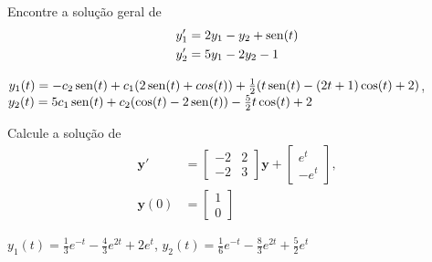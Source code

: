 \begin{exer}
  Encontre a solução geral de
  \begin{align}
    y_1' &= 2y_1 - y_2 + \operatorname{sen}(t)\\
    y_2' &= 5y_1 - 2y_2 - 1
  \end{align}
\end{exer}
\begin{resp}
  $y_{1}(t) = -c_2 \operatorname{sen}(t) + c_1 (2 \operatorname{sen}(t) + cos(t)) + \frac{1}{2}(t \operatorname{sen}(t) - (2 t + 1) \cos(t) + 2)$, $y_2(t) = 5 c_1 \operatorname{sen}(t) + c_2 (\cos(t) - 2 \operatorname{sen}(t)) - \frac{5}{2} t \cos(t) + 2$
\end{resp}

\begin{exer}
  Calcule a solução de
  \begin{align}
    \pmb{y}' &=
    \begin{bmatrix}
      -2 & 2 \\
      -2 & 3
    \end{bmatrix}\pmb{y} +
    \begin{bmatrix}
      e^{t} \\ -e^{t}
    \end{bmatrix}, \\
    \pmb{y}(0) &=
                 \begin{bmatrix}
                   1\\
                   0
                 \end{bmatrix}
  \end{align}
\end{exer}
\begin{resp}
  $y_{1}(t) = \frac{1}{3}e^{-t} - \frac{4}{3}e^{2t} + 2 e^t$, $y_{2}(t) = \frac{1}{6}e^{-t} - \frac{8}{3}e^{2t} + \frac{5}{2} e^t$
\end{resp}
